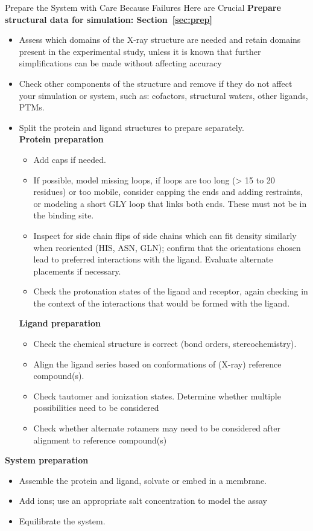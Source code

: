 \documentclass[9pt,bestpractices]{livecoms}
\begin{document}
\begin{Checklists*}
\begin{checklist}{Prepare the System with Care Because Failures Here are Crucial}
\textbf{Prepare structural data for simulation: Section~\ref{sec:prep}}
    \begin{itemize}
        \item Assess which domains of the X-ray structure are needed and retain domains present in the experimental study, unless it is known that further simplifications can be made without affecting accuracy
        \item Check other components of the structure and remove if they do not affect your simulation or system, such as: cofactors, structural waters, other ligands, PTMs.
        \item Split the protein and ligand structures to prepare separately.\\
        \textbf{Protein preparation}
    \begin{itemize}
                \item Add caps if needed.
                \item If possible, model missing loops, if loops are too long (> 15 to 20 residues) or too mobile, consider capping the ends and adding restraints, or modeling a short GLY loop that links both ends. These must not be in the binding site.
                \item Inspect for  side chain flips of side chains which can fit density similarly when reoriented (HIS, ASN, GLN); confirm that the orientations chosen lead to preferred interactions with the ligand. Evaluate alternate placements if necessary.
                \item Check the protonation states of the ligand and receptor, again checking in the context of the interactions that would be formed with the ligand.
    \end{itemize}
        \textbf{Ligand preparation}
    \begin{itemize}
            \item Check the chemical structure is correct (bond orders, stereochemistry).
            \item Align the ligand series based on conformations of (X-ray) reference compound(s).
            \item Check tautomer and ionization states. Determine whether multiple possibilities need to be considered
            \item Check whether alternate rotamers may need to be considered after alignment to reference compound(s)
    \end{itemize}
    \end{itemize}
        \textbf{System preparation}
    \begin{itemize}
        \item Assemble the protein and ligand, solvate or embed in a membrane. 
        \item Add ions; use an appropriate salt concentration to model the assay
        \item Equilibrate the system.
    \end{itemize}
\end{checklist}


\end{Checklists*}
\end{document}
